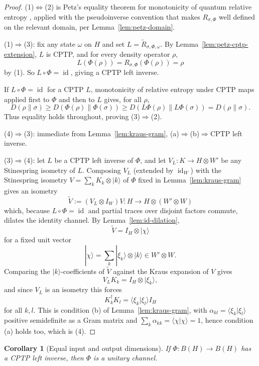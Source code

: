 \documentclass[11pt]{article}
\newtheorem{corollary}[theorem]{Corollary}
\DeclareMathOperator{\id}{id}
\begin{document}
\begin{proof}
(1)$\Leftrightarrow$(2) is Petz's equality theorem for monotonicity of
quantum relative entropy \cite{Petz1986}, applied with the pseudoinverse
convention that makes $R_{\sigma,\Phi}$ well defined on the relevant
domain, per Lemma~\ref{lem:petz-domain}.

(1)$\Rightarrow$(3): fix any state $\omega$ on $H$ and set
$L=\widetilde R_{\sigma,\Phi,\omega}$. By
Lemma~\ref{lem:petz-cptp-extension}, $L$ is CPTP, and for every density
operator $\rho$,
\[
L(\Phi(\rho))=R_{\sigma,\Phi}(\Phi(\rho))=\rho
\]
by (1). So $L\circ\Phi=\id$, giving a CPTP left inverse.

If $L\circ\Phi=\id$ for a CPTP $L$, monotonicity of relative entropy under
CPTP maps \cite{Lindblad1975, Uhlmann1977} applied first to $\Phi$ and
then to $L$ gives, for all $\rho$,
\[
D(\rho\|\sigma)
\ge
D(\Phi(\rho)\|\Phi(\sigma))
\ge
D(L\Phi(\rho)\|L\Phi(\sigma))
=
D(\rho\|\sigma).
\]
Thus equality holds throughout, proving (3)$\Rightarrow$(2).

(4)$\Rightarrow$(3): immediate from Lemma~\ref{lem:kraus-gram},
(a)$\Rightarrow$(b)$\Rightarrow$CPTP left inverse.

(3)$\Rightarrow$(4): let $L$ be a CPTP left inverse of $\Phi$, and let
$V_L:K\to H\otimes W'$ be any Stinespring isometry of $L$. Composing $V_L$
(extended by $\id_W$) with the Stinespring isometry
$V=\sum_k K_k\otimes|k\rangle$ of $\Phi$ fixed in
Lemma~\ref{lem:kraus-gram} gives an isometry
\[
\widetilde V:=(V_L\otimes I_W)V:H\to H\otimes(W'\otimes W)
\]
which, because $L\circ\Phi=\id$ and partial traces over disjoint factors
commute, dilates the identity channel. By Lemma~\ref{lem:id-dilation},
\[
\widetilde V=I_H\otimes|\chi\rangle
\]
for a fixed unit vector
\[
|\chi\rangle=\sum_k|\xi_k\rangle\otimes|k\rangle\in W'\otimes W.
\]
Comparing the $|k\rangle$-coefficients of $\widetilde V$ against the Kraus
expansion of $V$ gives
\[
V_LK_k=I_H\otimes|\xi_k\rangle,
\]
and since $V_L$ is an isometry this forces
\[
K_k^\dagger K_l=\langle\xi_k|\xi_l\rangle I_H
\]
for all $k,l$. This is condition (b) of Lemma~\ref{lem:kraus-gram}, with
$\alpha_{kl}=\langle\xi_k|\xi_l\rangle$ positive semidefinite as a Gram matrix
and $\sum_k\alpha_{kk}=\langle\chi|\chi\rangle=1$, hence condition (a)
holds too, which is (4).
\end{proof}

\begin{corollary}[Equal input and output dimensions]
\label{cor:unitary-if-square}
If $\Phi:B(H)\to B(H)$ has a CPTP left inverse, then $\Phi$ is a unitary
channel.
\end{corollary}
\end{document}
